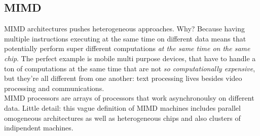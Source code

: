 \documentclass[10pt,a4paper]{article}
\begin{document}
			\subsection{MIMD}
				MIMD architectures pushes heterogeneous approaches. Why? Because having multiple instructions executing at the same time on different data means that potentially perform super different computations \emph{at the same time on the same chip}. The perfect example is mobile multi purpose devices, that have to handle a ton of computations at the same time that are not \emph{so computationally expensive}, but they're all different from one another: text processing lives besides video processing and communications.\\
				MIMD processors are arrays of processors that work asynchronoulsy on different data. Little detail: this vague definition of MIMD machines includes parallel omogeneous architectures as well as heterogeneous chips and also clusters of indipendent machines.\\
				
\end{document}
